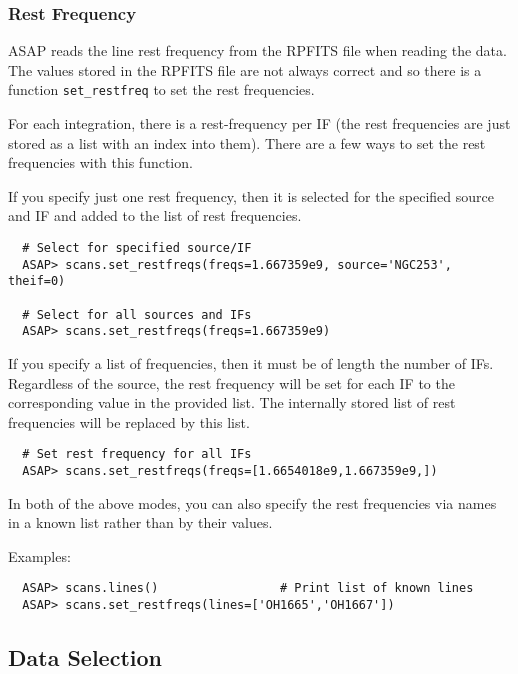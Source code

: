 \documentclass[11pt]{article}
\newcommand{\cmd}[1]{{\tt #1}}
\begin{document}
\subsubsection{Rest Frequency}

ASAP reads the line rest frequency
from the RPFITS file when reading the data. The values stored in the
RPFITS file are not always correct and so there is a function
\cmd{set\_restfreq} to set the rest frequencies.

For each integration, there is a rest-frequency per IF (the rest
frequencies are just stored as a list with an index into them).
There are a few ways to set the rest frequencies with this function.

If you specify just one rest frequency, then it is selected for the
specified source and IF and added to the list of rest frequencies.

\begin{verbatim}
  # Select for specified source/IF
  ASAP> scans.set_restfreqs(freqs=1.667359e9, source='NGC253', theif=0)

  # Select for all sources and IFs
  ASAP> scans.set_restfreqs(freqs=1.667359e9)
\end{verbatim}


If you specify a list of frequencies, then it must be of length the
number of IFs.  Regardless of the source, the rest frequency will be set
for each IF to the corresponding value in the provided list.  The
internally stored list of rest frequencies will be replaced by this
list.


\begin{verbatim}
  # Set rest frequency for all IFs
  ASAP> scans.set_restfreqs(freqs=[1.6654018e9,1.667359e9,])

\end{verbatim}

In both of the above modes, you can also specify the rest frequencies via
names in a known list rather than by their values.

Examples:

\begin{verbatim}
  ASAP> scans.lines()                 # Print list of known lines
  ASAP> scans.set_restfreqs(lines=['OH1665','OH1667'])
\end{verbatim}


\subsection{Data Selection}
\end{document}
